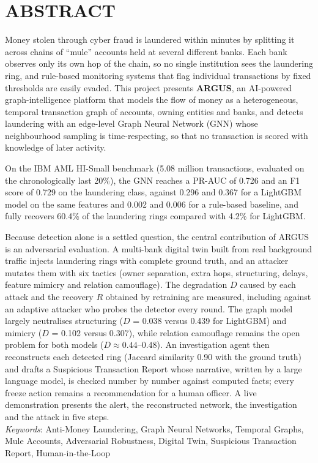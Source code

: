 \clearpage
{}
{}
\chapter*{ABSTRACT}

Money stolen through cyber fraud is laundered within minutes by splitting it across chains of ``mule'' accounts held at several different banks. Each bank observes only its own hop of the chain, so no single institution sees the laundering ring, and rule-based monitoring systems that flag individual transactions by fixed thresholds are easily evaded. This project presents \textbf{ARGUS}, an AI-powered graph-intelligence platform that models the flow of money as a heterogeneous, temporal transaction graph of accounts, owning entities and banks, and detects laundering with an edge-level Graph Neural Network (GNN) whose neighbourhood sampling is time-respecting, so that no transaction is scored with knowledge of later activity.

On the IBM AML HI-Small benchmark (5.08 million transactions, evaluated on the chronologically last 20\%), the GNN reaches a PR-AUC of 0.726 and an F1 score of 0.729 on the laundering class, against 0.296 and 0.367 for a LightGBM model on the same features and 0.002 and 0.006 for a rule-based baseline, and fully recovers 60.4\% of the laundering rings compared with 4.2\% for LightGBM.

Because detection alone is a settled question, the central contribution of ARGUS is an adversarial evaluation. A multi-bank digital twin built from real background traffic injects laundering rings with complete ground truth, and an attacker mutates them with six tactics (owner separation, extra hops, structuring, delays, feature mimicry and relation camouflage). The degradation $D$ caused by each attack and the recovery $R$ obtained by retraining are measured, including against an adaptive attacker who probes the detector every round. The graph model largely neutralises structuring ($D$ = 0.038 versus 0.439 for LightGBM) and mimicry ($D$ = 0.102 versus 0.307), while relation camouflage remains the open problem for both models ($D \approx 0.44$--$0.48$). An investigation agent then reconstructs each detected ring (Jaccard similarity 0.90 with the ground truth) and drafts a Suspicious Transaction Report whose narrative, written by a large language model, is checked number by number against computed facts; every freeze action remains a recommendation for a human officer. A live demonstration presents the alert, the reconstructed network, the investigation and the attack in five steps.
\\

\noindent\textit{Keywords}: Anti-Money Laundering, Graph Neural Networks, Temporal Graphs, Mule Accounts, Adversarial Robustness, Digital Twin, Suspicious Transaction Report, Human-in-the-Loop
